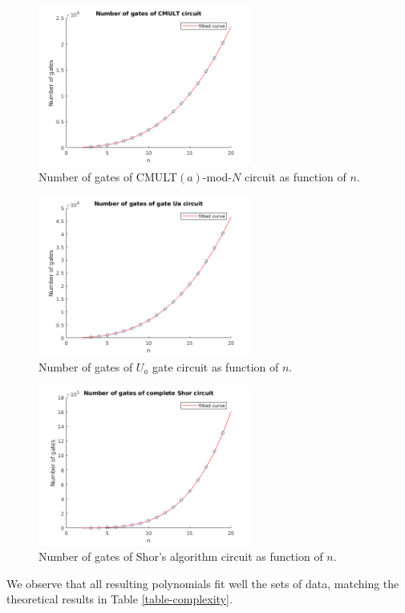 \documentclass[a4paper, 10pt]{article}
\numberwithin{equation}{section}
\numberwithin{figure}{section}
\numberwithin{table}{section}
\begin{document}
\begin{figure}[h!]
	\centering
	\includegraphics[width=7cm]{Figures/data-cmult}
	\caption{Number of gates of CMULT$(a)$-mod-$N$ circuit as function of $n$.}
	\label{fit-cmult}
\end{figure}

\begin{figure}[h!]
	\centering
	\includegraphics[width=7cm]{Figures/data-Ua}
	\caption{Number of gates of $U_a$ gate circuit as function of $n$.}
	\label{fit-ua}
\end{figure}

\begin{figure}[h!]
	\centering
	\includegraphics[width=7cm]{Figures/data-shor}
	\caption{Number of gates of Shor's algorithm circuit as function of $n$.}
	\label{fit-shor}
\end{figure}

We observe that all resulting polynomials fit well the sets of data, matching the theoretical results in Table \ref{table-complexity}.
\end{document}
